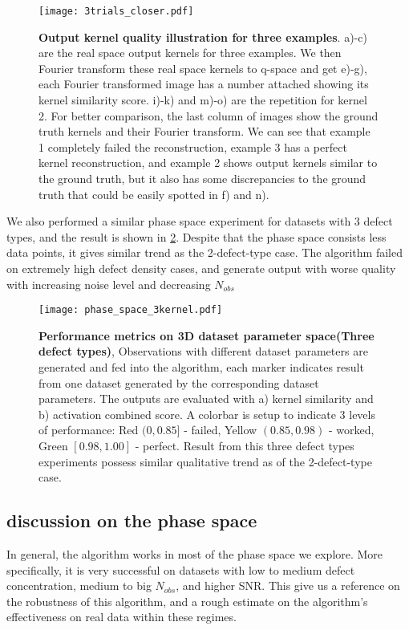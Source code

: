 \begin{figure}
	\texttt{[image: 3trials\_closer.pdf]} 
	\centering
	\caption[\textbf{Output kernel quality illustration for three examples}]{\textbf{Output kernel quality illustration for three examples}. a)-c) are the real space output kernels for three examples. We then Fourier transform these real space kernels to q-space and get e)-g), each Fourier transformed image has a number attached showing its kernel similarity score. i)-k) and m)-o) are the repetition for kernel 2. For better comparison, the last column of images show the ground truth kernels and their Fourier transform. We can see that example 1 completely failed the reconstruction, example 3 has a perfect kernel reconstruction, and example 2 shows output kernels similar to the ground truth, but it also has some discrepancies to the ground truth that could be easily spotted in f) and n).}
	\label{fig:regimes_closer}
\end{figure}

We also performed a similar phase space experiment for datasets with 3 defect types, and the result is shown in \ref{fig:phase_spaceN=3}. Despite that the phase space consists less data points, it gives similar trend as the 2-defect-type case. The algorithm failed on extremely high defect density cases, and generate output with worse quality with increasing noise level and decreasing $N_{obs}$ 

\begin{figure}
	\texttt{[image: phase\_space\_3kernel.pdf]} 
	\centering
	\caption[\textbf{Performance metrics on 3D dataset parameter space(Three defect types)}]{\textbf{Performance metrics on 3D dataset parameter space(Three defect types)}, Observations with different dataset parameters are generated and fed into the algorithm, each marker indicates result from one dataset generated by the corresponding dataset parameters. The outputs are evaluated with a) kernel similarity and b) activation combined score. A colorbar is setup to indicate 3 levels of performance: Red $(0,0.85]$ - failed, Yellow $(0.85,0.98)$ - worked, Green $[0.98,1.00]$ - perfect. Result from this three defect types experiments possess similar qualitative trend as of the 2-defect-type case.}
	\label{fig:phase_spaceN=3}
\end{figure}
\subsection{discussion on the phase space}
In general, the algorithm works in most of the phase space we explore. More specifically, it is very successful on datasets with low to medium defect concentration, medium to big $N_{obs}$, and higher SNR. This give us a reference on the robustness of this algorithm, and a rough estimate on the algorithm's effectiveness on real data within these regimes.

